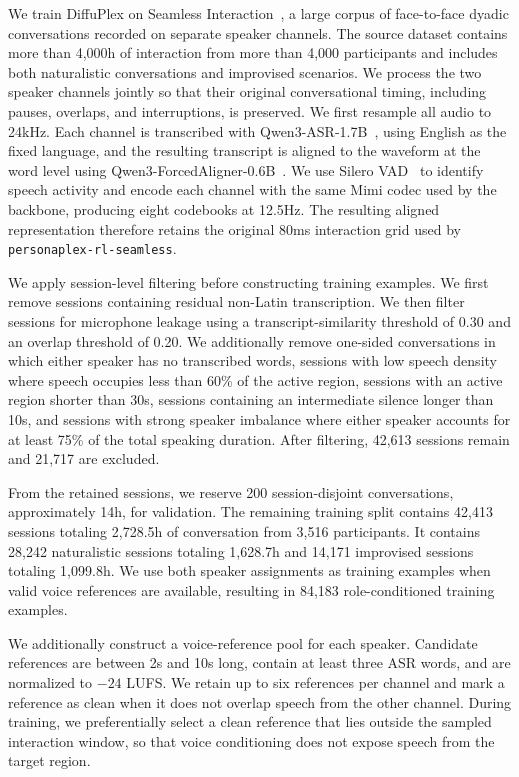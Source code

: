 We train DiffuPlex on Seamless Interaction~\citep{agrawal2025seamlessinteractiondyadicaudiovisual}, a large corpus of face-to-face dyadic conversations recorded on separate speaker channels.
The source dataset contains more than 4,000h of interaction from more than 4,000 participants and includes both naturalistic conversations and improvised scenarios.
We process the two speaker channels jointly so that their original conversational timing, including pauses, overlaps, and interruptions, is preserved. 
We first resample all audio to 24kHz.
Each channel is transcribed with Qwen3-ASR-1.7B~\citep{shi2026qwen3asrtechnicalreport}, using English as the fixed language, and the resulting transcript is aligned to the waveform at the word level using Qwen3-ForcedAligner-0.6B~\citep{shi2026qwen3asrtechnicalreport}.
We use Silero VAD~\citep{SileroVAD} to identify speech activity and encode each channel with the same Mimi codec used by the backbone, producing eight codebooks at 12.5Hz.
The resulting aligned representation therefore retains the original 80ms interaction grid used by \texttt{personaplex-rl-seamless}.

We apply session-level filtering before constructing training examples.
We first remove sessions containing residual non-Latin transcription.
We then filter sessions for microphone leakage using a transcript-similarity threshold of 0.30 and an overlap threshold of 0.20.
We additionally remove one-sided conversations in which either speaker has no transcribed words, sessions with low speech density where speech occupies less than 60\% of the active region, sessions with an active region shorter than 30s, sessions containing an intermediate silence longer than 10s, and sessions with strong speaker imbalance where either speaker accounts for at least 75\% of the total speaking duration.
After filtering, 42,613 sessions remain and 21,717 are excluded.

From the retained sessions, we reserve 200 session-disjoint conversations, approximately 14h, for validation.
The remaining training split contains 42,413 sessions totaling 2,728.5h of conversation from 3,516 participants.
It contains 28,242 naturalistic sessions totaling 1,628.7h and 14,171 improvised sessions totaling 1,099.8h.
We use both speaker assignments as training examples when valid voice references are available, resulting in 84,183 role-conditioned training examples.

We additionally construct a voice-reference pool for each speaker.
Candidate references are between 2s and 10s long, contain at least three ASR words, and are normalized to $-24$ LUFS.
We retain up to six references per channel and mark a reference as clean when it does not overlap speech from the other channel.
During training, we preferentially select a clean reference that lies outside the sampled interaction window, so that voice conditioning does not expose speech from the target region.

